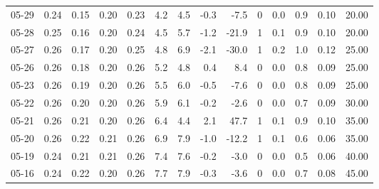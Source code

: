 \begin{threeparttable}
{\begin{tabular}{lrrrrrrrrrrrrr}
  05-29 &          0.24 &          0.15 &          0.20 &        0.23 &                 4.2 &                 4.5 &       -0.3 &         -7.5 &              0 &                 0.0 &              0.9 &            0.10 &                  20.00 \\
  05-28 &          0.25 &          0.16 &          0.20 &        0.24 &                 4.5 &                 5.7 &       -1.2 &        -21.9 &              1 &                 0.1 &              0.9 &            0.10 &                  20.00 \\
  05-27 &          0.26 &          0.17 &          0.20 &        0.25 &                 4.8 &                 6.9 &       -2.1 &        -30.0 &              1 &                 0.2 &              1.0 &            0.12 &                  25.00 \\
  05-26 &          0.26 &          0.18 &          0.20 &        0.26 &                 5.2 &                 4.8 &        0.4 &          8.4 &              0 &                 0.0 &              0.8 &            0.09 &                  25.00 \\
  05-23 &          0.26 &          0.19 &          0.20 &        0.26 &                 5.5 &                 6.0 &       -0.5 &         -7.6 &              0 &                 0.0 &              0.8 &            0.09 &                  25.00 \\
  05-22 &          0.26 &          0.20 &          0.20 &        0.26 &                 5.9 &                 6.1 &       -0.2 &         -2.6 &              0 &                 0.0 &              0.7 &            0.09 &                  30.00 \\
  05-21 &          0.26 &          0.21 &          0.20 &        0.26 &                 6.4 &                 4.4 &        2.1 &         47.7 &              1 &                 0.1 &              0.9 &            0.10 &                  35.00 \\
  05-20 &          0.26 &          0.22 &          0.21 &        0.26 &                 6.9 &                 7.9 &       -1.0 &        -12.2 &              1 &                 0.1 &              0.6 &            0.06 &                  35.00 \\
  05-19 &          0.24 &          0.21 &          0.21 &        0.26 &                 7.4 &                 7.6 &       -0.2 &         -3.0 &              0 &                 0.0 &              0.5 &            0.06 &                  40.00 \\
  05-16 &          0.24 &          0.22 &          0.20 &        0.26 &                 7.7 &                 7.9 &       -0.3 &         -3.6 &              0 &                 0.0 &              0.7 &            0.08 &                  45.00 \\

\end{tabular}}
\end{threeparttable}
